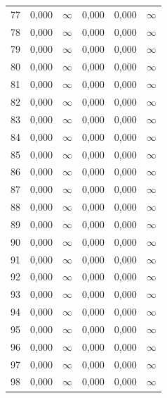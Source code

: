 \begin{tabular}{l c c c c c}
77 & 0,000 & $\infty$ & 0,000 & 0,000 & $\infty$ \\
78 & 0,000 & $\infty$ & 0,000 & 0,000 & $\infty$ \\
79 & 0,000 & $\infty$ & 0,000 & 0,000 & $\infty$ \\
80 & 0,000 & $\infty$ & 0,000 & 0,000 & $\infty$ \\
81 & 0,000 & $\infty$ & 0,000 & 0,000 & $\infty$ \\
82 & 0,000 & $\infty$ & 0,000 & 0,000 & $\infty$ \\
83 & 0,000 & $\infty$ & 0,000 & 0,000 & $\infty$ \\
84 & 0,000 & $\infty$ & 0,000 & 0,000 & $\infty$ \\
85 & 0,000 & $\infty$ & 0,000 & 0,000 & $\infty$ \\
86 & 0,000 & $\infty$ & 0,000 & 0,000 & $\infty$ \\
87 & 0,000 & $\infty$ & 0,000 & 0,000 & $\infty$ \\
88 & 0,000 & $\infty$ & 0,000 & 0,000 & $\infty$ \\
89 & 0,000 & $\infty$ & 0,000 & 0,000 & $\infty$ \\
90 & 0,000 & $\infty$ & 0,000 & 0,000 & $\infty$ \\
91 & 0,000 & $\infty$ & 0,000 & 0,000 & $\infty$ \\
92 & 0,000 & $\infty$ & 0,000 & 0,000 & $\infty$ \\
93 & 0,000 & $\infty$ & 0,000 & 0,000 & $\infty$ \\
94 & 0,000 & $\infty$ & 0,000 & 0,000 & $\infty$ \\
95 & 0,000 & $\infty$ & 0,000 & 0,000 & $\infty$ \\
96 & 0,000 & $\infty$ & 0,000 & 0,000 & $\infty$ \\
97 & 0,000 & $\infty$ & 0,000 & 0,000 & $\infty$ \\
98 & 0,000 & $\infty$ & 0,000 & 0,000 & $\infty$ \\
\hline 
 \end{tabular}
